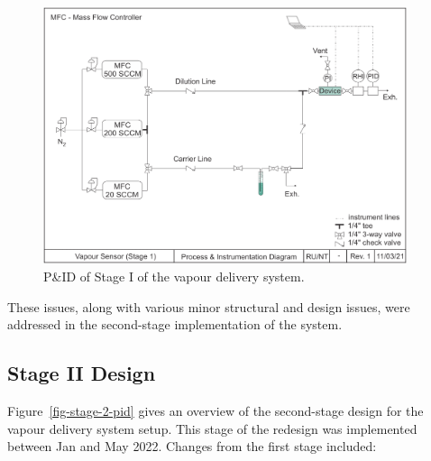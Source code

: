 \documentclass[
  a4paper,
]{scrbook}
\begin{document}
\begin{figure}

{\centering \includegraphics[width=0.95\textwidth,height=\textheight]{figures/ch8/PID_V1.png}

}

\caption[P\&ID of Stage I of the vapour delivery
system.]{\label{fig-stage-1-pid}P\&ID of Stage I of the vapour delivery
system.}

\end{figure}

These issues, along with various minor structural and design issues,
were addressed in the second-stage implementation of the system.

\hypertarget{stage-ii-design}{%
\subsection{Stage II Design}\label{stage-ii-design}}

Figure~\ref{fig-stage-2-pid} gives an overview of the second-stage
design for the vapour delivery system setup. This stage of the redesign
was implemented between Jan and May 2022. Changes from the first stage
included:
\end{document}
